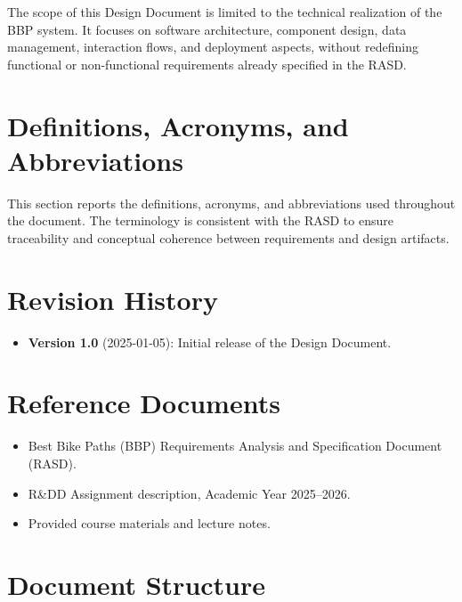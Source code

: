 \par The scope of this Design Document is limited to the technical realization of the BBP
system. It focuses on software architecture, component design, data management,
interaction flows, and deployment aspects, without redefining functional or non-functional
requirements already specified in the RASD.

\section{Definitions, Acronyms, and Abbreviations}
\label{sec:definitions-acronyms-abbreviations}%

\par This section reports the definitions, acronyms, and abbreviations used throughout
the document. The terminology is consistent with the RASD to ensure traceability and
conceptual coherence between requirements and design artifacts.

\section{Revision History}
\label{sec:revision-history}%

\begin{itemize}
      \item \textbf{Version 1.0} (2025-01-05): Initial release of the Design Document.
\end{itemize}

\section{Reference Documents}
\label{sec:reference-documents}%

\begin{itemize}
      \item Best Bike Paths (BBP) Requirements Analysis and Specification Document (RASD).
      \item R\&DD Assignment description, Academic Year 2025--2026.
      \item Provided course materials and lecture notes.
\end{itemize}

\section{Document Structure}
\label{sec:document-structure}%

